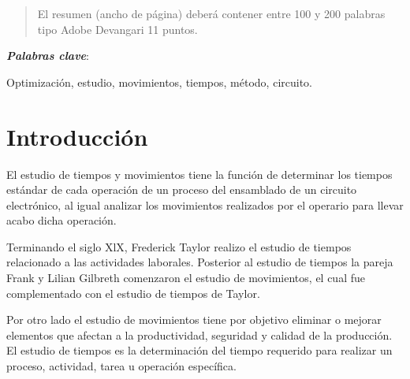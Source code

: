     
    
    \begin{abstract}
    \noindent 
    El resumen (ancho de página) deberá contener entre 100 y 200 palabras tipo Adobe Devangari 11 puntos.
    
    \end{abstract}
    \textbf{\textit{Palabras clave}}: 
    
    Optimización, estudio, movimientos, tiempos, método, circuito.
    
    \section{Introducción}
    
         El estudio de tiempos y movimientos tiene la función de determinar los tiempos estándar de cada operación de un proceso del ensamblado de un circuito electrónico, al igual analizar los movimientos realizados por el operario para llevar acabo dicha operación.
    
         Terminando el siglo XlX, Frederick Taylor realizo el estudio de tiempos relacionado a las actividades laborales. Posterior al estudio de tiempos la pareja Frank y Lilian Gilbreth comenzaron el estudio de movimientos, el cual fue complementado con el estudio de tiempos de Taylor.\cite{niebel1980ingenieria}
         
         Por otro lado el estudio de movimientos tiene por objetivo eliminar o mejorar elementos que afectan a la productividad, seguridad y calidad de la producción. El estudio de tiempos es la determinación del tiempo requerido para realizar un proceso, actividad, tarea u operación específica.\cite{parra2020analisis}
    
